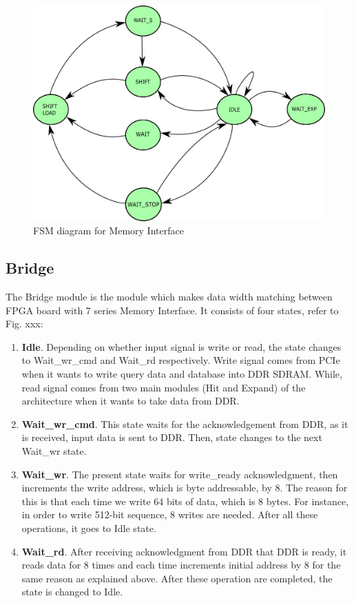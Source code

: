 \begin{figure}
\centering
\includegraphics[width=\columnwidth]{Figures/FSM_Mem_New.pdf}
\caption{FSM diagram for Memory Interface} \label{fig:MemInt}
\end{figure}


\subsection{Bridge}
\quad The Bridge module is the module which makes data width matching between FPGA board with 7 series Memory Interface. It consists of four states, refer to Fig. xxx:
\begin{enumerate}
\item \textbf{Idle}. Depending on whether input signal is write or read, the state changes to Wait\_wr\_cmd and Wait\_rd respectively. Write signal comes from PCIe when it wants to write query data and database into DDR SDRAM. While, read signal comes from two main modules (Hit and Expand) of the architecture when it wants to take data from DDR.
\item \textbf{Wait\_wr\_cmd}. This state waits for the acknowledgement from DDR, as it is received, input data is sent to DDR. Then, state changes to the next Wait\_wr state.
\item \textbf{Wait\_wr}. The present state waits for write\_ready acknowledgment, then increments the write address, which is byte addressable, by 8. The reason for this is that each time we write 64 bits of data, which is 8 bytes. For instance, in order to write 512-bit sequence, 8 writes are needed. After all these operations, it goes to Idle state.
\item \textbf{Wait\_rd}. After receiving acknowledgment from DDR that DDR is ready, it reads data for 8 times and each time increments initial address by 8 for the same reason as explained above. After these operation are completed, the state is changed to Idle. 
\end{enumerate}


